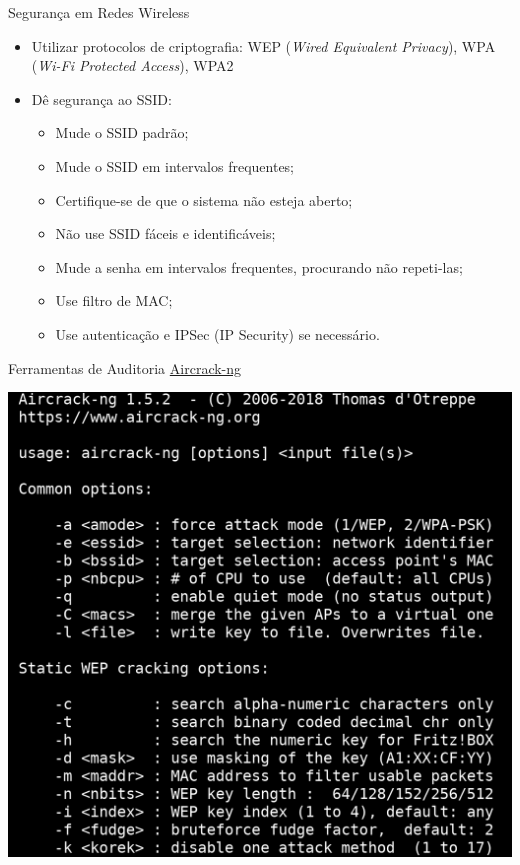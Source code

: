 \begin{frame}{Segurança em Redes Wireless}
  
  \begin{itemize}[<+->]
  \item Utilizar protocolos de criptografia: WEP ({\em Wired
      Equivalent Privacy}), WPA ({\em Wi-Fi Protected Access}), WPA2
  \item Dê segurança ao SSID:
\begin{itemize}[<+->]
  \item Mude o SSID padrão;
  \item Mude o SSID em intervalos frequentes;
  \item Certifique-se de que o sistema não esteja aberto;
  \item Não use SSID fáceis e identificáveis;
  \item Mude a senha em intervalos frequentes, procurando não repeti-las;
  \item Use filtro de MAC;
  \item Use autenticação e IPSec (IP Security) se necessário.
\end{itemize}
\end{itemize}

\end{frame}


\begin{frame}{Ferramentas de Auditoria}
\href{https://www.aircrack-ng.org/}{Aircrack-ng}\bigskip

\includegraphics[scale=.2]{img/aircrack-ng.png}

\end{frame}

